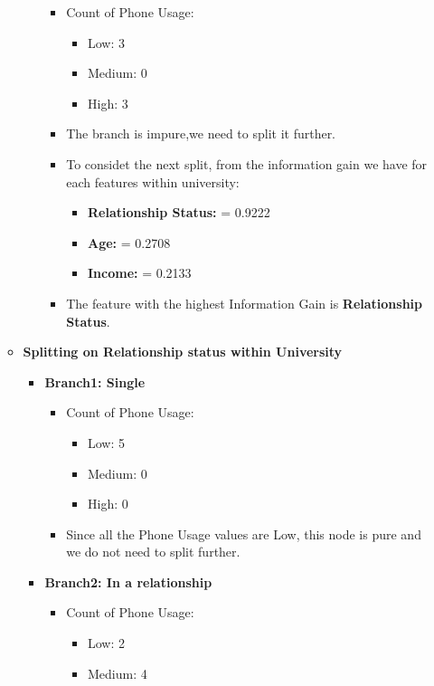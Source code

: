 \documentclass{article}
\begin{document}
\begin{enumerate}[label=\alph*)]
\begin{itemize}
\begin{itemize}
\begin{itemize}
         \item Count of Phone Usage:
         \begin{itemize}
            \item Low: 3
            \item Medium: 0
            \item High: 3
         \end{itemize}
         \item The branch is impure,we need to split it further.
         \item To considet the next split, from the information gain we have for each features within university:
         \begin{itemize}
            \item \textbf{Relationship Status:} = 0.9222
            \item \textbf{Age:} = 0.2708
            \item \textbf{Income:} = 0.2133
         \end{itemize}
         \item The feature with the highest Information Gain is \textbf{Relationship Status}.
      \end{itemize}
   \end{itemize}
   \item \textbf{Splitting on Relationship status within University}
   \begin{itemize}
      \item \textbf{Branch1: Single}
      \begin{itemize}
         \item Count of Phone Usage:
         \begin{itemize}
            \item Low: 5
            \item Medium: 0
            \item High: 0
         \end{itemize}
         \item Since all the Phone Usage values are Low, this node is pure and we do not need to split further.
      \end{itemize}
      \item \textbf{Branch2: In a relationship}
      \begin{itemize}
         \item Count of Phone Usage:
         \begin{itemize}
            \item Low: 2
            \item Medium: 4

\end{itemize}
\end{itemize}
\end{itemize}
\end{itemize}
\end{enumerate}
\end{document}
